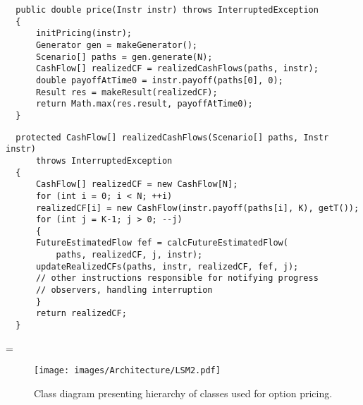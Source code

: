 \documentclass[a4paper,11pt, twoside]{book}
\newenvironment{absolutelynopagebreak}
  {\par\nobreak\vfill\penalty0\vfilneg
   \vtop\bgroup}
  {\par\xdef\tpd{\the\prevdepth}\egroup
   \prevdepth=\tpd}
\theoremstyle{definition}
\theoremstyle{remark}
\begin{document}
\begin{lstlisting}
  public double price(Instr instr) throws InterruptedException
  {       
      initPricing(instr);
      Generator gen = makeGenerator();
      Scenario[] paths = gen.generate(N);
      CashFlow[] realizedCF = realizedCashFlows(paths, instr);
      double payoffAtTime0 = instr.payoff(paths[0], 0);
      Result res = makeResult(realizedCF);
      return Math.max(res.result, payoffAtTime0);
  }
\end{lstlisting} 
\begin{absolutelynopagebreak}
\begin{lstlisting}
  protected CashFlow[] realizedCashFlows(Scenario[] paths, Instr instr)
	  throws InterruptedException
  {
      CashFlow[] realizedCF = new CashFlow[N];
      for (int i = 0; i < N; ++i)
	  realizedCF[i] = new CashFlow(instr.payoff(paths[i], K), getT());
      for (int j = K-1; j > 0; --j)
      {
	  FutureEstimatedFlow fef = calcFutureEstimatedFlow(
	      paths, realizedCF, j, instr);
	  updateRealizedCFs(paths, instr, realizedCF, fef, j);
	  // other instructions responsible for notifying progress
	  // observers, handling interruption
      }       
      return realizedCF;
  }
\end{lstlisting} 
\end{absolutelynopagebreak}

\begin{figure}
\centering
 \texttt{[image: images/Architecture/LSM2.pdf]}
\caption{Class diagram presenting hierarchy of classes used for option pricing.}
\label{fig:arch:LSM}
\end{figure}
\newpage
\end{document}
